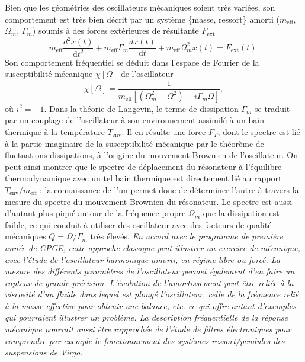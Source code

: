 \documentclass[12pt,a4paper]{article}
\renewcommand{\d}{\mathrm{d}}
\begin{document}
Bien que les géométries des oscillateurs mécaniques soient très variées, son comportement est très bien décrit par un système \{masse, ressort\} amorti ($m_\mathrm{eff}$, $\Omega_m$, $\Gamma_m$) soumis à des forces extérieures de résultante $F_\mathrm{ext}$
\begin{equation}
m_\mathrm{eff} \frac{d^2 x(t)}{\d t^2} + m_\mathrm{eff}\Gamma_m \frac{d x(t)}{\d t} + m_\mathrm{eff} \Omega_m^2 x(t) = F_\mathrm{ext}(t).
\end{equation}
Son comportement fréquentiel se déduit dans l'espace de Fourier de la susceptibilité mécanique $\chi[\Omega]$ de l'oscillateur 
\begin{equation}
\chi[\Omega] = \frac{1}{m_\mathrm{eff}[(\Omega_m^2-\Omega^2)-i\Gamma_m\Omega]},
\end{equation}
où $i^2=-1$. 
Dans la théorie de Langevin, le terme de dissipation $\Gamma_m$ se traduit par un couplage de l'oscillateur à son environnement assimilé à un bain thermique à la température $T_\mathrm{env}$.
Il en résulte une force $F_T$, dont le spectre est lié à la partie imaginaire de la susceptibilité mécanique par le théorème de fluctuations-dissipations, à l'origine du mouvement Brownien de l'oscillateur.
On peut ainsi montrer que le spectre de déplacement du résonateur à l'équilibre thermodynamique avec un tel bain thermique est directement lié au rapport $T_\mathrm{env}/m_\mathrm{eff}$ : la connaissance de l'un permet donc de déterminer l'autre à travers la mesure du spectre du mouvement Brownien du résonateur.
Le spectre est aussi d'autant plus piqué autour de la fréquence propre $\Omega_m$ que la dissipation est faible, ce qui conduit à utiliser des oscillateur avec des facteurs de qualité mécaniques $Q=\Omega/\Gamma_m$ très élevés.
\emph{En accord avec le programme de première année de CPGE, cette approche classique peut illustrer un exercice de mécanique, avec l'étude de l'oscillateur harmonique amorti, en régime libre ou forcé.
La mesure des différents paramètres de l'oscillateur permet également d'en faire un capteur de grande précision.
L'évolution de l'amortissement peut être reliée à la viscosité d'un fluide dans lequel est plongé l'oscillateur, celle de la fréquence relié à la masse effective pour obtenir une balance, etc. ce qui offre autant d'exemples qui pourraient illustrer un problème.
La description fréquentielle de la réponse mécanique pourrait aussi être rapprochée de l'étude de filtres électroniques pour comprendre par exemple le fonctionnement des systèmes ressort/pendules des suspensions de Virgo.}
\end{document}
